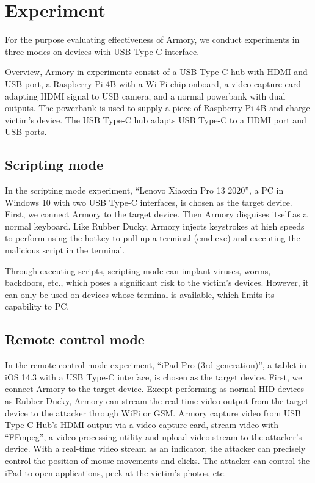 \section{Experiment}
\label{sec:experiment}

For the purpose evaluating effectiveness of Armory, we conduct experiments in three modes on devices with USB Type-C interface. 

Overview, Armory in experiments consist of a USB Type-C hub with HDMI and USB port,
a Raspberry Pi 4B with a Wi-Fi chip onboard,
a video capture card adapting HDMI signal to USB camera,
and a normal powerbank with dual outputs.
The powerbank is used to supply a piece of Raspberry Pi 4B and charge victim's device.
The USB Type-C hub adapts USB Type-C to a HDMI port and USB ports.


\subsection{Scripting mode}

In the scripting mode experiment, ``Lenovo Xiaoxin Pro 13 2020'', a PC in Windows 10 with two USB Type-C interfaces, is chosen as the target device. First, we connect Armory to the target device. Then Armory disguises itself as a normal keyboard. Like Rubber Ducky, Armory injects keystrokes at high speeds to perform using the hotkey to pull up a terminal (cmd.exe) and executing the malicious script in the terminal. 

Through executing scripts, scripting mode can implant viruses, worms, backdoors, etc., which poses a significant risk to the victim's devices. 
However, it can only be used on devices whose terminal is available, which limits its capability to PC. 

\subsection{Remote control mode}

In the remote control mode experiment, ``iPad Pro (3rd generation)'', a tablet in iOS 14.3 with a USB Type-C interface, is chosen as the target device. First, we connect Armory to the target device. 
Except performing as normal HID devices as Rubber Ducky, Armory can stream the real-time video output from the target device to the attacker through WiFi or GSM. 
Armory capture video from USB Type-C Hub's HDMI output via a video capture card, stream video with ``FFmpeg'', a video processing utility and upload video stream to the attacker's device.    
With a real-time video stream as an indicator, the attacker can precisely control the position of mouse movements and clicks. The attacker can control the iPad to open applications, peek at the victim's photos, etc.

